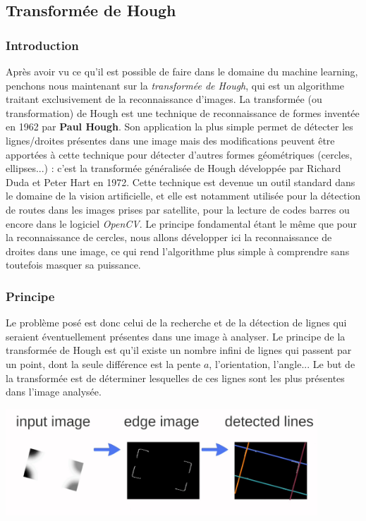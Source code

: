 \subsection{Transform\'ee de Hough}

\subsubsection{Introduction}
Après avoir vu ce qu'il est possible de faire dans le domaine du machine learning, penchons nous maintenant sur la \textit{transformée de Hough}, qui est un algorithme traitant exclusivement de la reconnaissance d'images. La transform\'ee (ou transformation) de Hough est une technique de reconnaissance de formes invent\'ee en 1962 par \textbf{Paul Hough}.
Son application la plus simple permet de d\'etecter les lignes/droites pr\'esentes dans une image mais des modifications peuvent \^etre apport\'ees \`a cette technique pour d\'etecter d'autres formes g\'eom\'etriques (cercles, ellipses...) : c'est la transform\'ee g\'en\'eralis\'ee de Hough d\'evelopp\'ee par Richard Duda et Peter Hart en 1972.
Cette technique est devenue un outil standard dans le domaine de la vision artificielle, et elle est notamment utilisée pour la d\'etection de routes dans les images prises par satellite, pour la lecture de codes barres ou encore dans le logiciel \textit{OpenCV}.
Le principe fondamental étant le même que pour la reconnaissance de cercles, nous allons développer ici la reconnaissance de droites dans une image, ce qui rend l'algorithme plus simple à comprendre sans toutefois masquer sa puissance.

\subsubsection{Principe}
Le probl\`eme pos\'e est donc celui de la recherche et de la d\'etection de lignes qui seraient \'eventuellement pr\'esentes dans une image \`a analyser. Le principe de la transform\'ee de Hough est qu'il existe un nombre infini de lignes qui passent par un point, dont la seule diff\'erence est la pente $a$, l'orientation, l'angle... Le but de la transform\'ee est de d\'eterminer lesquelles de ces lignes sont les plus pr\'esentes dans l'image analys\'ee.
\begin{center}
\includegraphics[height=4cm]{images/hough_1.png}
\end{center}

